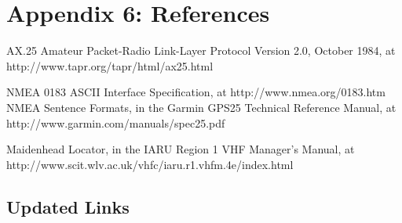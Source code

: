 \chapter{Appendix 6: References}


AX.25 Amateur Packet-Radio Link-Layer Protocol Version 2.0, October 1984, at
http://www.tapr.org/tapr/html/ax25.html

NMEA 0183 ASCII Interface Specification, at http://www.nmea.org/0183.htm
NMEA Sentence Formats, in the Garmin GPS25 Technical Reference Manual, at
http://www.garmin.com/manuals/spec25.pdf

Maidenhead Locator, in the IARU Region 1 VHF Manager’s Manual, at
http://www.scit.wlv.ac.uk/vhfc/iaru.r1.vhfm.4e/index.html

\section {Updated Links}
